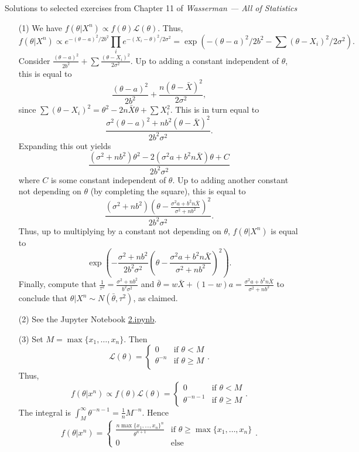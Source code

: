 \documentclass[10pt]{article}
\begin{document}
\noindent \large{Solutions to selected exercises from Chapter 11 of
\emph{Wasserman --- All of Statistics}}

\begin{enumerate}[(1)]
\item[(1)]
We have $f(\theta|X^n)\propto f(\theta)\mathcal L(\theta)$. Thus,
\[
    f(\theta|X^n)\propto
    e^{-(\theta-a)^2/2b^2} \prod_i e^{-(X_i-\theta)^2/2\sigma^2} =
    \exp\left(-(\theta-a)^2/2b^2 - \sum (\theta - X_i)^2/2\sigma^2\right).
\]
Consider $\frac{(\theta-a)^2}{2b^2} + \sum \frac{(\theta - X_i)^2}{2\sigma^2}$.
Up to adding a constant independent of $\theta$, this is equal to
\[
    \frac{(\theta-a)^2}{2b^2} + \frac{n(\theta - \bar X)^2}{2\sigma^2},
\]
since $\sum (\theta - X_i)^2=\theta^2 - 2n\bar X \theta + \sum X_i^2$.
This is in turn equal to
\[
    \frac{\sigma^2(\theta - a)^2 + nb^2(\theta - \bar X)^2}{2b^2\sigma^2}.
\]
Expanding this out yields
\[
    \frac{(\sigma^2 + nb^2)\theta^2 - 2(\sigma^2a + b^2 n\bar X)\theta + C}
    {2b^2\sigma^2}
\]
where $C$ is some constant independent of $\theta$. Up to adding another constant
not depending on $\theta$ (by completing the square), this is equal to
\[
    \frac{(\sigma^2 + nb^2)\left(\theta - \frac{\sigma^2a + b^2 n\bar X}
    {\sigma^2+nb^2}\right)^2}
    {2b^2\sigma^2}.
\]
Thus, up to multiplying by a constant not depending on $\theta$, $f(\theta|X^n)$
is equal to
\[
    \exp\left(-\frac{\sigma^2+nb^2}{2b^2\sigma^2}
    \left(\theta-\frac{\sigma^2a+b^2n\bar X}{\sigma^2+nb^2}\right)^2\right).
\]
Finally, compute that $\frac{1}{\tau^2}=\frac{\sigma^2+nb^2}{b^2\sigma^2}$
and $\bar \theta = w\bar X + (1-w)a=\frac{\sigma^2a+b^2n\bar X}{\sigma^2 + nb^2}$
to conclude that $\theta|X^n \sim N(\bar \theta, \tau^2)$, as claimed.


\item[(2)]
See the Jupyter Notebook
\href{https://github.com/ajrasmus/some_of_statistics/blob/main/chapter_11/2.ipynb}{2.ipynb}.


\item[(3)] Set $M=\max\{x_1,\ldots,x_n\}$. Then
\[
    \mathcal L(\theta) = \begin{cases}
        0 & \text{if } \theta < M \\
        \theta^{-n} & \text{if } \theta \geq M \\
    \end{cases}.
\]
Thus,
\[
    f(\theta | x^n) \propto f(\theta)\mathcal L(\theta) =
    \begin{cases}
        0 & \text{if } \theta < M \\
        \theta^{-n-1} & \text{if } \theta \geq M
    \end{cases}.
\]
The integral is $\int_M^\infty \theta^{-n-1} = \frac{1}{n}M^{-n}$.
Hence
\[
    f(\theta|x^n) = \begin{cases}
        \frac{n\max\{x_1,\ldots,x_n\}^n}{\theta^{n+1}} &
        \text{if } \theta \geq \max\{x_1,\ldots,x_n\} \\
        0 & \text{else }
    \end{cases}.
\]


\end{enumerate}
\end{document}
